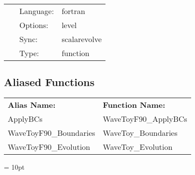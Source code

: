 \hspace{5mm}{\it boundaries of 3d wave equation } 


\hspace{5mm}

 \begin{tabular*}{160mm}{cll} 
~ & Language:  & fortran \\ 
~ & Options:  & level \\ 
~ & Sync:  & scalarevolve \\ 
~ & Type:  & function \\ 
\end{tabular*} 


\subsection*{Aliased Functions}

\hspace{5mm}

 \begin{tabular*}{160mm}{ll} 

{\bf Alias Name:} ~~~~~~~ & {\bf Function Name:} \\ 
ApplyBCs & WaveToyF90\_ApplyBCs \\ 
WaveToyF90\_Boundaries & WaveToy\_Boundaries \\ 
WaveToyF90\_Evolution & WaveToy\_Evolution \\ 
\end{tabular*} 



\vspace{5mm}\parskip = 10pt 

